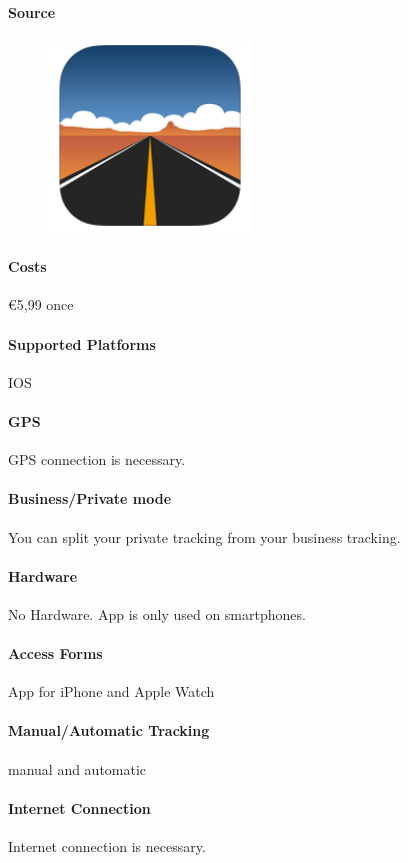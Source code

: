 \paragraph{Source} 
\begin{figure}
  \begin{center}
    \includegraphics[width=0.48\textwidth]{fahrtenbuch}
  \end{center}
\end{figure}
\paragraph{Costs} \euro 5,99 once
\paragraph{Supported Platforms} IOS
\paragraph{GPS} GPS connection is necessary.
\paragraph{Business/Private mode} You can split your private tracking from your business tracking.
\paragraph{Hardware} No Hardware. App is only used on smartphones.
\paragraph{Access Forms} App for iPhone and Apple Watch
\paragraph{Manual/Automatic Tracking} manual and automatic
\paragraph{Internet Connection} Internet connection is necessary.
